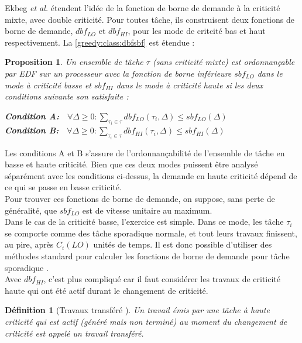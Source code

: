\documentclass[12pt,a4paper,oneside]{book}
\theoremstyle{break}
\newtheorem{defin}{Définition}[chapter]
\theoremstyle{breakplain}
\newtheorem{prop}{Proposition}[chapter]
\begin{document}
Ekbeg \textit{et al.} étendent l'idée de la fonction de borne de demande à la criticité mixte, avec double criticité. Pour toutes tâche, ils construisent deux fonctions de borne de demande, $dbf_{LO}$ et $dbf_{HI}$, pour les mode de critcité bas et haut respectivement. La \autoref{greedy:class:dbfsbf} est étendue :

\begin{prop}
\label{greedy:mc:dbfsbf}
Un ensemble de tâche $\tau$ (sans criticité mixte) est ordonnançable par \textit{EDF} sur un processeur avec la fonction de borne inférieure $sbf_{LO}$ dans le mode à criticité basse et $sbf_{HI}$ dans le mode à criticité haute si les deux conditions suivante son satisfaite :
\begin{center}
\textbf{\textit{Condition A:}}$\quad \forall \Delta \ge 0 : \underset{\tau_i \in \tau}{\sum}dbf_{LO}(\tau_i, \Delta) \le sbf_{LO}(\Delta)$\\
\textbf{\textit{Condition B:}}$\quad \forall \Delta \ge 0 : \underset{\tau_i \in \tau}{\sum}dbf_{HI}(\tau_i, \Delta) \le sbf_{HI}(\Delta)$
\end{center}
\end{prop}

Les conditions A et B s'assure de l'ordonnançabilité de l'ensemble de tâche en basse et haute criticité. Bien que ces deux modes puissent être analysé séparément avec les conditions ci-dessus, la demande en haute criticité dépend de ce qui se passe en basse criticité.\\

Pour trouver ces fonctions de borne de demande, on suppose, sans perte de généralité, que $sbf_{LO}$ est de vitesse unitaire au maximum.\\
Dans le cas de la criticité basse, l'exercice est simple. Dans ce mode, les tâche $\tau_i$ se comporte comme des tâche sporadique normale, et tout leurs travaux finissent, au pire, après $C_i(LO)$ unités de temps. Il est donc possible d'utiliser des méthodes standard pour calculer les fonctions de borne de demande pour tâche sporadique \cite{baruah1990preemptively}.\\

Avec $dbf_{HI}$, c'est plus compliqué  car il faut considérer les travaux de criticité haute qui ont été actif durant le changement de criticité.

\begin{defin}[Travaux transféré \cite{ekberg2014bounding}]
Un travail émis par une tâche à haute criticité  qui est actif (généré mais non terminé) au moment du changement de criticité est appelé un travail transféré.
\end{defin}
\end{document}
